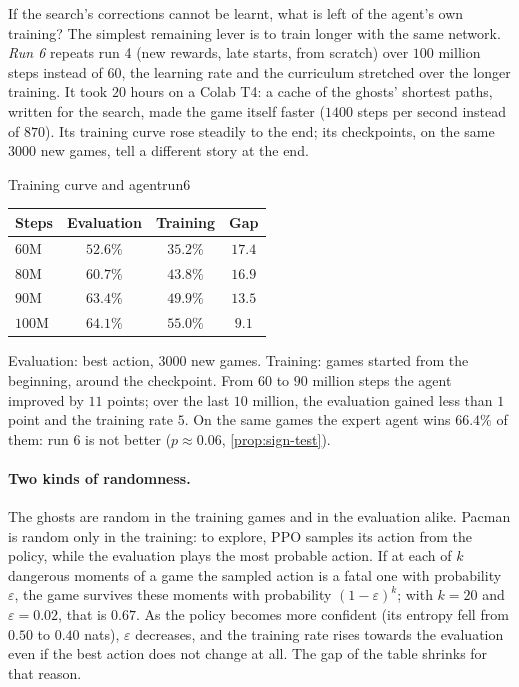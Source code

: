 If the search's corrections cannot be learnt, what is left of the agent's
own training? The simplest remaining lever is to train longer with the
same network. \emph{Run 6} repeats run 4 (new rewards, late
starts, from scratch) over $100$ million steps instead of $60$, the learning
rate and the curriculum stretched over the longer training. It took $20$
hours on a Colab T4: a cache of the ghosts' shortest paths, written for the
search, made the game itself faster ($1400$ steps per second instead of
$870$). Its training curve rose steadily to the end; its checkpoints, on
the same $3000$ new games, tell a different story at the end.

\begin{pacman}{Training curve and agent}{run6}
  \begin{center}
    \begin{tabular}{@{}lccc@{}}
      \toprule
      Steps & Evaluation & Training & Gap \\
      \midrule
      $60$M & $52.6\%$ & $35.2\%$ & $17.4$ \\
      $80$M & $60.7\%$ & $43.8\%$ & $16.9$ \\
      $90$M & $63.4\%$ & $49.9\%$ & $13.5$ \\
      $100$M & $64.1\%$ & $55.0\%$ & $9.1$ \\
      \bottomrule
    \end{tabular}
  \end{center}
  Evaluation: best action, $3000$ new games. Training: games started from
  the beginning, around the checkpoint. From $60$ to $90$ million steps the
  agent improved by $11$ points; over the last $10$ million, the evaluation
  gained less than $1$ point and the training rate $5$. On the same games
  the expert agent wins $66.4\%$ of them: run 6 is not better
  ($p \approx 0.06$, \cref{prop:sign-test}).
\end{pacman}

\paragraph{Two kinds of randomness.} The ghosts are random in the training
games and in the evaluation alike. Pacman is random only in the training:
to explore, PPO samples its action from the policy, while the evaluation
plays the most probable action. If at each of $k$ dangerous moments of a
game the sampled action is a fatal one with probability $\varepsilon$, the
game survives these moments with probability $(1 - \varepsilon)^k$; with
$k = 20$ and $\varepsilon = 0.02$, that is $0.67$. As the policy becomes
more confident (its entropy fell from $0.50$ to $0.40$ nats), $\varepsilon$
decreases, and the training rate rises towards the evaluation even if the
best action does not change at all. The gap of the table shrinks for that
reason.

